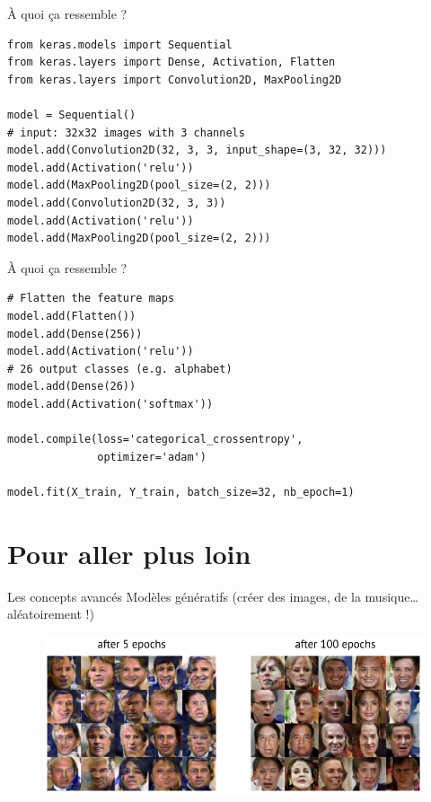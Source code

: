\documentclass{beamer}
\begin{document}
\begin{frame}[fragile]{À quoi ça ressemble ?}
\begin{verbatim}
from keras.models import Sequential
from keras.layers import Dense, Activation, Flatten
from keras.layers import Convolution2D, MaxPooling2D

model = Sequential()
# input: 32x32 images with 3 channels
model.add(Convolution2D(32, 3, 3, input_shape=(3, 32, 32)))
model.add(Activation('relu'))
model.add(MaxPooling2D(pool_size=(2, 2)))
model.add(Convolution2D(32, 3, 3))
model.add(Activation('relu'))
model.add(MaxPooling2D(pool_size=(2, 2)))
\end{verbatim}
\end{frame}

\begin{frame}[fragile]{À quoi ça ressemble ?}
\begin{verbatim}
# Flatten the feature maps
model.add(Flatten())
model.add(Dense(256))
model.add(Activation('relu'))
# 26 output classes (e.g. alphabet)
model.add(Dense(26))
model.add(Activation('softmax'))

model.compile(loss='categorical_crossentropy',
              optimizer='adam')

model.fit(X_train, Y_train, batch_size=32, nb_epoch=1)
\end{verbatim}
\end{frame}

\section{Pour aller plus loin}
\begin{frame}{Les concepts avancés}  
Modèles génératifs (créer des images, de la musique\dots aléatoirement !)

\begin{figure}
	\includegraphics[width=\textwidth]{gan_faces}
\end{figure}
\end{frame}
\end{document}
